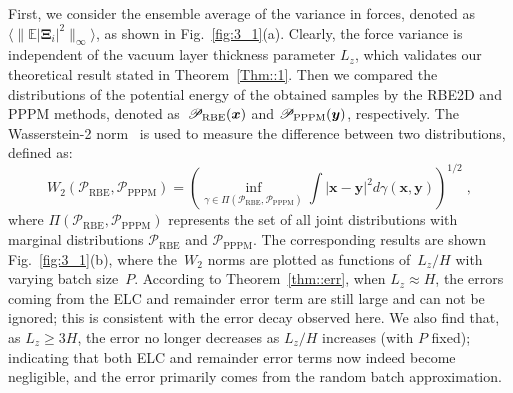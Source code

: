 First, we consider the ensemble average of the variance in forces, denoted as $\langle\|\mathbb{E}|\bm{\Xi}_i|^2\|_{\infty}\rangle$, as shown in Fig.~\ref{fig:3_1}(a). 
Clearly, the force variance is independent   {of} the vacuum layer thickness parameter $L_z$, which validates our theoretical result stated in Theorem~\ref{Thm::1}. 
 {Then we compared the distributions of the potential energy of the obtained samples by the RBE2D and PPPM methods, denoted as~$\mathscr{P}_{\text{RBE}}(\boldsymbol{x})$ and $\mathscr{P}_{\text{PPPM}}(\boldsymbol{y})$, respectively.
The Wasserstein-2 norm~\cite{santambrogio2015optimal, kolbe_2024_10912241} is used to measure the difference between two distributions, defined as:}
\begin{equation}\label{eq::W2}
    W_2(\mathscr{P}_{\text{RBE}}, \mathscr{P}_{\text{PPPM}})=\left(\inf _{\gamma \in \Pi(\mathscr{P}_{\text{RBE}}, \mathscr{P}_{\text{PPPM}})} \int|\bm{x} - \bm{y}|^2 d  {\gamma(\bm{x},\bm{y})}\right)^{1 / 2}\;,
\end{equation}
where $\Pi(\mathscr{P}_{\text{RBE}}, \mathscr{P}_{\text{PPPM}})$ represents the set of all joint distributions with marginal distributions $\mathscr{P}_{\text{RBE}}$ and $\mathscr{P}_{\text{PPPM}}$.
The corresponding results are shown Fig.~\ref{fig:3_1}(b), where the~$W_2$ norms are   {plotted} as functions of~$L_z / H$ with   {varying} batch size~$P$.
According to Theorem~\ref{thm::err}, when $L_z\approx H$, the errors coming from the ELC and remainder error term are still large and can not be ignored;   {this} is consistent with the error decay observed here. 
We also find that, as $L_z\geq 3H$, the error no longer decreases as $L_z/H$ increases (with $P$ fixed); indicating that
both ELC and remainder error terms now indeed become negligible, and the error primarily comes from the random batch approximation. 



